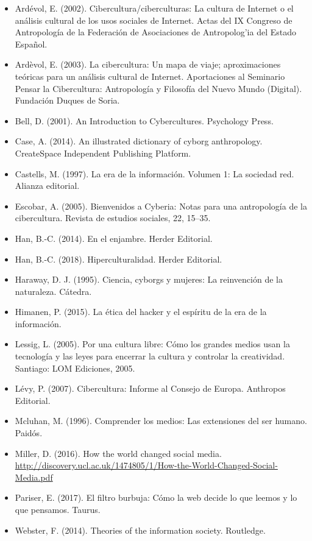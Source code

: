 \documentclass[]{book}
\providecommand{\tightlist}{%
  \setlength{\itemsep}{0pt}\setlength{\parskip}{0pt}}
\begin{document}
\begin{itemize}
\tightlist
\item
  Ardévol, E. (2002). Cibercultura/ciberculturas: La cultura de Internet o el análisis cultural de los usos sociales de Internet. Actas del IX Congreso de Antropología de la Federación de Asociaciones de Antropolog'ia del Estado Español.
\item
  Ardèvol, E. (2003). La cibercultura: Un mapa de viaje; aproximaciones teóricas para un análisis cultural de Internet. Aportaciones al Seminario Pensar la Cibercultura: Antropología y Filosofía del Nuevo Mundo (Digital). Fundación Duques de Soria.
\item
  Bell, D. (2001). An Introduction to Cybercultures. Psychology Press.
\item
  Case, A. (2014). An illustrated dictionary of cyborg anthropology. CreateSpace Independent Publishing Platform.
\item
  Castells, M. (1997). La era de la información. Volumen 1: La sociedad red. Alianza editorial.
\item
  Escobar, A. (2005). Bienvenidos a Cyberia: Notas para una antropología de la cibercultura. Revista de estudios sociales, 22, 15--35.
\item
  Han, B.-C. (2014). En el enjambre. Herder Editorial.
\item
  Han, B.-C. (2018). Hiperculturalidad. Herder Editorial.
\item
  Haraway, D. J. (1995). Ciencia, cyborgs y mujeres: La reinvención de la naturaleza. Cátedra.
\item
  Himanen, P. (2015). La ética del hacker y el espíritu de la era de la información.
\item
  Lessig, L. (2005). Por una cultura libre: Cómo los grandes medios usan la tecnología y las leyes para encerrar la cultura y controlar la creatividad. Santiago: LOM Ediciones, 2005.
\item
  Lévy, P. (2007). Cibercultura: Informe al Consejo de Europa. Anthropos Editorial.
\item
  Mcluhan, M. (1996). Comprender los medios: Las extensiones del ser humano. Paidós.
\item
  Miller, D. (2016). How the world changed social media. \url{http://discovery.ucl.ac.uk/1474805/1/How-the-World-Changed-Social-Media.pdf}
\item
  Pariser, E. (2017). El filtro burbuja: Cómo la web decide lo que leemos y lo que pensamos. Taurus.
\item
  Webster, F. (2014). Theories of the information society. Routledge.
\end{itemize}
\end{document}
